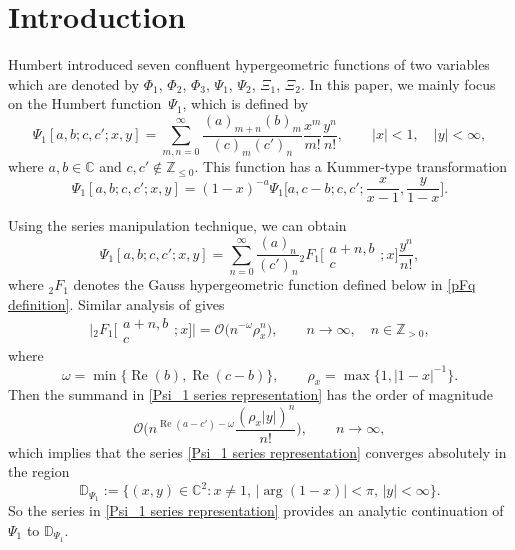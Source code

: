 \documentclass[pdftex]{sigma}
\numberwithin{equation}{section}
\newcommand{\CC}{\ensuremath{\mathbb{C}}}
\newcommand{\ZZ}{\ensuremath{\mathbb{Z}}}
\newcommand{\DD}{\ensuremath{\mathbb{D}}}
\newcommand{\mo}{\mathcal{O}}
\begin{document}
\section{Introduction}
Humbert \cite{Humbert-1922} introduced seven confluent hypergeometric functions of two variables which are denoted by $\Phi_1$, $\Phi_2$, $\Phi_3$, $\Psi_1$, $\Psi_2$, $\Xi_1$, $\Xi_2$. In this paper, we mainly focus on the Humbert function~$\Psi_1$, which is defined by
\[\Psi_1[a,b;c,c';x,y]=\sum_{m,n=0}^{\infty}\frac{(a)_{m+n}(b)_m}{(c)_m(c')_n}\frac{x^m}{m!}\frac{y^n}{n!},\qquad |x|<1,\quad |y|<\infty,\]
where $a,b\in\CC$ and $c,c'\notin\ZZ_{\leqslant 0}$. This function has a Kummer-type transformation \cite[equation~(2.54)]{Choi_Hasanov-2011}
\begin{equation}\label{Psi_1 Kummer transformation}
	\Psi_1[a,b;c,c';x,y]=(1-x)^{-a}\Psi_1\biggl[a,c-b;c,c';\frac{x}{x-1},\frac{y}{1-x}\biggr].
\end{equation}

Using the series manipulation technique, we can obtain \cite[equation~(83)]{Brychkov_Saad-2014}
\begin{equation}\label{Psi_1 series representation}
	\Psi_1[a,b;c,c';x,y]=\sum_{n=0}^{\infty}\frac{(a)_n}{(c')_n}{}_2F_1\biggl[\begin{matrix}
		a+n,b \\
		c
	\end{matrix};x\biggr]\frac{y^n}{n!},
\end{equation}
where $_2F_1$ denotes the Gauss hypergeometric function defined below in \eqref{pFq definition}. Similar analysis of \cite[equation~(14)]{Luo_Raina-2021} gives
\[\biggl|{}_2F_1\bigg[\begin{matrix}
	a+n,b \\
	c
\end{matrix};x\bigg]\biggr|=\mo\big(n^{-\omega}\rho_x^n\big),\qquad n\to\infty,\quad n\in\ZZ_{>0},\]
where
\[\omega=\min\{\operatorname{Re}(b),\operatorname{Re}(c-b)\},\qquad \rho_x=\max\bigl\{1,|1-x|^{-1}\bigr\}.\]
Then the summand in \eqref{Psi_1 series representation} has the order of magnitude
\[\mo\bigg(n^{\operatorname{Re}(a-c')-\omega}\frac{(\rho_x|y|)^n}{n!}\bigg),\qquad n\to\infty,\]
which implies that the series \eqref{Psi_1 series representation} converges absolutely in the region
\[\DD_{\Psi_1}:=\bigl\{(x,y)\in\CC^2\colon x\ne 1,\, |{\arg}(1-x)|<\pi,\, |y|<\infty\bigr\}.\]
So the series in \eqref{Psi_1 series representation} provides an analytic continuation of $\Psi_1$ to $\DD_{\Psi_1}$.
\end{document}
